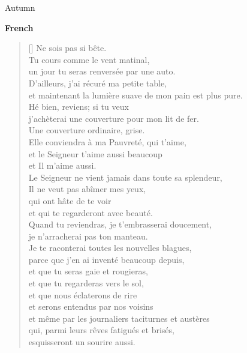 \documentclass[a4paper,12pt,twoside,final]{book}
\begin{document}
Autumn

\newpage

\noindent \textbf{French}


\settowidth{\versewidth}{et maintenant la lumière tendre de mon pain est plus pure.}

\begin{verse}[\versewidth]
  Ne sois pas si bête. \\
  Tu cours comme le vent matinal, \\
  un jour tu seras renversée par une auto. \\
  D'ailleurs, j'ai récuré ma petite table, \\
  et maintenant la lumière suave de mon pain est plus pure. \\
  Hé bien, reviens; si tu veux \\
  j'achèterai une couverture pour mon lit de fer. \\
  Une couverture ordinaire, grise. \\
  Elle conviendra à ma Pauvreté, qui t'aime, \\
  et le Seigneur t'aime aussi beaucoup \\
  et Il m'aime aussi. \\
  Le Seigneur ne vient jamais dans toute sa splendeur, \\
  Il ne veut pas abîmer mes yeux, \\
  qui ont hâte de te voir \\
  et qui te regarderont avec beauté. \\
  Quand tu reviendras, je t'embrasserai doucement, \\
  je n'arracherai pas ton manteau. \\
  Je te raconterai toutes les nouvelles blagues, \\
  parce que j'en ai inventé beaucoup depuis, \\
  et que tu seras gaie et rougieras, \\
  et que tu regarderas vers le sol, \\
  et que nous éclaterons de rire \\
  et serons entendus par nos voisins \\
  et même par les journaliers taciturnes et austères \\
  qui, parmi leurs rêves fatigués et brisés, \\
  esquisseront un sourire aussi. \\
\end{verse}
\end{document}
